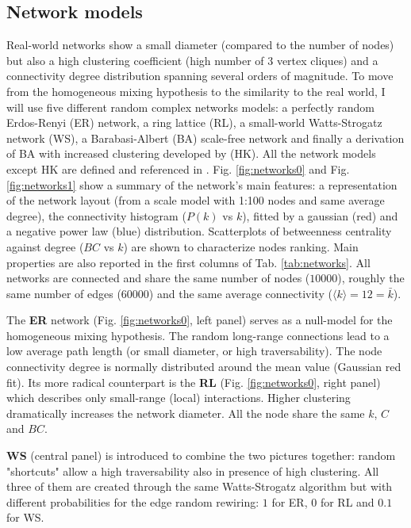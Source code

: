 \documentclass[DIV=12, BCOR=0pt]{scrartcl}  %
\begin{document}
  \subsection{Network models}
  Real-world networks show a small diameter (compared to the number of nodes) but also a high clustering coefficient (high number of 3 vertex cliques) and a connectivity degree distribution spanning several orders of magnitude.
  To move from the homogeneous mixing hypothesis to the similarity to the real world, I will use five different random complex networks models: a perfectly random Erdos-Renyi (ER) network, a ring lattice (RL), a small-world Watts-Strogatz network (WS), a Barabasi-Albert (BA) scale-free network and finally a derivation of BA with increased clustering developed by \citet{Holme} (HK). All the network models except HK are defined and referenced in \citet{PastorSatorras}.
  Fig. \ref{fig:networks0} and Fig. \ref{fig:networks1} show a summary of the network's main features: a representation of the network layout (from a scale model with 1:100 nodes and same average degree), the connectivity histogram ($P(k)$ vs $k$), fitted by a gaussian (red) and a negative power law (blue) distribution.   
  Scatterplots of betweenness centrality against degree ($BC$ vs $k$) are shown to characterize nodes ranking.  Main properties are also reported in the first columns of Tab. \ref{tab:networks}. All networks are connected and share the same number of nodes ($10000$), roughly the same number of edges ($60000$) and the same average connectivity ($\langle k \rangle = 12 = \bar{k}$).
  
  The \textbf{ER} network (Fig. \ref{fig:networks0}, left panel) serves as a null-model for the homogeneous mixing hypothesis. The random long-range connections lead to a low average path length (or small diameter, or high traversability). The node connectivity degree is normally distributed around the mean value (Gaussian red fit). 
  Its more radical counterpart is the \textbf{RL} (Fig. \ref{fig:networks0}, right panel) which describes only small-range (local) interactions. Higher clustering dramatically increases the network diameter. All the node share the same $k$, $C$ and $BC$. 
  
  \textbf{WS} (central panel) is introduced to combine the two pictures together: random "shortcuts" allow a high traversability also in presence of high clustering. All three of them are created through the same Watts-Strogatz algorithm but with different probabilities for the edge random rewiring: $1$ for ER, $0$ for RL and $0.1$ for WS.
  
\end{document}
